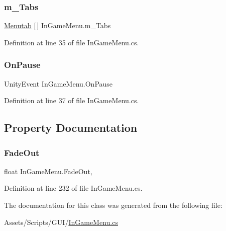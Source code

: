 \subsubsection{\texorpdfstring{m\+\_\+\+Tabs}{m\_Tabs}}
{\footnotesize\ttfamily \mbox{\hyperlink{class_in_game_menu_1_1_menutab}{Menutab}} \mbox{[}$\,$\mbox{]} In\+Game\+Menu.\+m\+\_\+\+Tabs}



Definition at line 35 of file In\+Game\+Menu.\+cs.

\mbox{\label{class_in_game_menu_a02c2f5cc6db0ebf7c27edd01a3eaf03f}} 
\subsubsection{\texorpdfstring{On\+Pause}{OnPause}}
{\footnotesize\ttfamily Unity\+Event In\+Game\+Menu.\+On\+Pause}



Definition at line 37 of file In\+Game\+Menu.\+cs.



\subsection{Property Documentation}
\mbox{\label{class_in_game_menu_aad9dd59135a6647480d316fd8abc7350}} 
\subsubsection{\texorpdfstring{Fade\+Out}{FadeOut}}
{\footnotesize\ttfamily float In\+Game\+Menu.\+Fade\+Out\hspace{0.3cm}{\ttfamily [get]}, {\ttfamily [set]}}



Definition at line 232 of file In\+Game\+Menu.\+cs.



The documentation for this class was generated from the following file\+:\begin{DoxyCompactItemize}
\item 
Assets/\+Scripts/\+G\+U\+I/\mbox{\hyperlink{_in_game_menu_8cs}{In\+Game\+Menu.\+cs}}\end{DoxyCompactItemize}
